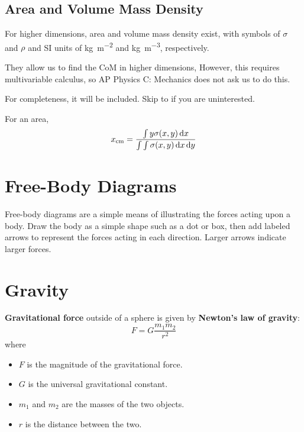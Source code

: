 \documentclass[a4paper, titlepage]{book}
\begin{document}
\subsection{Area and Volume Mass Density}

For higher dimensions, area and volume mass density exist,
with symbols of \(\sigma\) and \(\rho\)
and SI units of \unit{\kilogram \per \metre \squared}
and \unit{\kilogram \per \metre \cubed}, respectively.

They allow us to find the CoM in higher dimensions,
However, this requires multivariable calculus,
so AP Physics C: Mechanics does not ask us to do this.

For completeness, it will be included.
Skip to  if you are uninterested.

For an area,
\begin{equation}
    x_\mathrm{cm} = \frac{\int y \sigma(x, y) \odif{x}}{\int \int \sigma(x, y) \odif{x} \odif{y}}
\end{equation}

\section{Free-Body Diagrams} \label{section:free-body-diagrams}

Free-body diagrams are a simple means of illustrating the forces acting upon a body.
Draw the body as a simple shape such as a dot or box,
then add labeled arrows to represent the forces acting in each direction.
Larger arrows indicate larger forces.


\section{Gravity}

\textbf{Gravitational force} outside of a sphere is given by \textbf{Newton's law of gravity}:
\begin{equation} \label{eq:newtons-law-of-gravity}
    F = G \frac{m_1 m_2}{r^2}
\end{equation}
where
\begin{itemize}
    \item \(F\) is the magnitude of the gravitational force.
    \item \(G\) is the universal gravitational constant.
    \item \(m_1\) and \(m_2\) are the masses of the two objects.
    \item \(r\) is the distance between the two.
\end{itemize}
\end{document}
